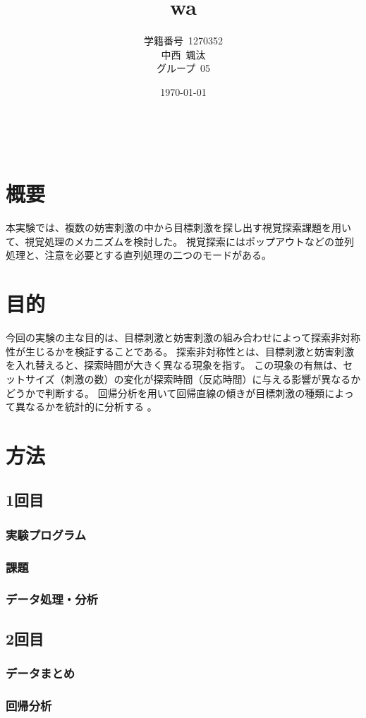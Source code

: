 \documentclass{jlreq}
\title{wa}
\author{学籍番号~1270352\\
        中西~颯汰\\
        グループ~05\\
        }
\date{\today}
\begin{document}
\maketitle
\clearpage　
\tableofcontents
\clearpage
\section{概要}
本実験では、複数の妨害刺激の中から目標刺激を探し出す視覚探索課題を用いて、視覚処理のメカニズムを検討した。
視覚探索にはポップアウトなどの並列処理と、注意を必要とする直列処理の二つのモードがある。



\section{目的}
今回の実験の主な目的は、目標刺激と妨害刺激の組み合わせによって探索非対称性が生じるかを検証することである。
探索非対称性とは、目標刺激と妨害刺激を入れ替えると、探索時間が大きく異なる現象を指す。
この現象の有無は、セットサイズ（刺激の数）の変化が探索時間（反応時間）に与える影響が異なるかどうかで判断する。
回帰分析を用いて回帰直線の傾きが目標刺激の種類によって異なるかを統計的に分析する 。
\section{方法}
\subsection{1回目}
\subsubsection*{実験プログラム}
\subsubsection*{課題}
\subsubsection*{データ処理・分析}

\subsection{2回目}
\subsubsection*{データまとめ}
\subsubsection*{回帰分析}
\end{document}
